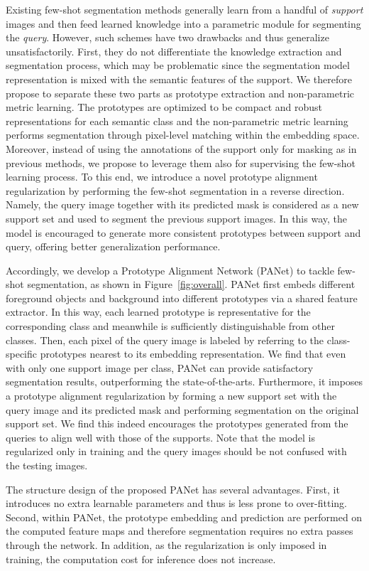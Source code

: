\documentclass[10pt,twocolumn,letterpaper]{article}
\begin{document}
Existing few-shot segmentation methods generally learn from a handful of \emph{support} images and then feed learned knowledge into a parametric module for segmenting the \emph{query}. However, such schemes have two drawbacks and thus generalize unsatisfactorily. First, they do not differentiate the knowledge extraction and segmentation process, which may be problematic since the segmentation model representation is mixed with the semantic features of the support. We therefore propose to separate these two parts as prototype extraction and non-parametric metric learning. The prototypes are optimized to be compact and robust representations for each semantic class and the non-parametric metric learning performs segmentation through pixel-level matching within the embedding space. Moreover, instead of using the annotations of the support only for masking as in previous methods, we propose to leverage them also for supervising the few-shot learning process. To this end, we introduce a novel prototype alignment regularization by performing the few-shot segmentation in a reverse direction. Namely, the query image together with its predicted mask is considered as a new support set and used to segment the previous support images. In this way, the model is encouraged to generate more consistent prototypes between  support and query, offering better generalization performance.


Accordingly, we develop a Prototype Alignment Network (PANet) to tackle few-shot segmentation, as shown in Figure~\ref{fig:overall}. PANet first embeds different foreground objects and background into different prototypes via a shared feature extractor. In this way, each learned prototype is representative for the corresponding class and meanwhile is sufficiently distinguishable from other classes. Then, each pixel of the query image is labeled by referring to the class-specific prototypes nearest to its embedding representation. We find that even with only one support image per class, PANet can provide satisfactory segmentation results, outperforming the state-of-the-arts. Furthermore, it imposes a prototype alignment regularization by forming a new support set with the query image and its predicted mask and performing segmentation on the original support set. We find this indeed encourages the prototypes generated from the queries to align well with those of the supports. Note that the model is regularized only in training and the query images should be not confused with the testing images.


The structure design of the proposed PANet has several advantages. First, it introduces no extra learnable parameters and thus is less prone to over-fitting. Second, within PANet, the prototype embedding and prediction are performed on the computed feature maps and therefore segmentation requires no extra passes through the network. In addition, as the regularization is only imposed in training, the computation cost for inference does not increase.
\end{document}
